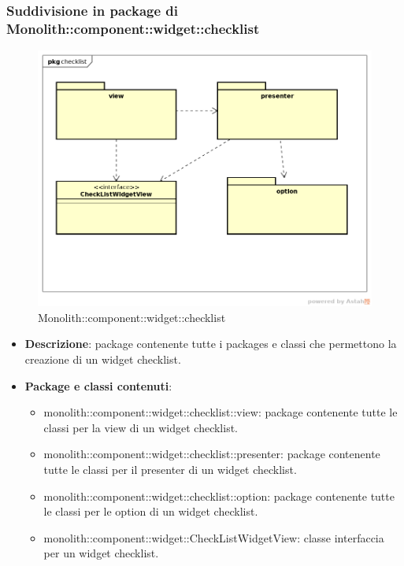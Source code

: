 \subsubsection{Suddivisione in package  di Monolith::component::widget::checklist}
\label{Monolith::component::widget::checklist}
\begin{figure}[H]
	\centering
	\includegraphics[scale=0.5]{Sezioni/imgPackage/component_widget_checklist.png}
	\caption{Monolith::component::widget::checklist}
\end{figure}
\begin{itemize}
	\item{\textbf{Descrizione}}: package contenente tutte i packages e classi che permettono la creazione di un widget checklist.
	\item{\textbf{Package e classi contenuti}}:
	\begin{itemize}
	\item{monolith::component::widget::checklist::view}: package contenente tutte le classi per la view di un widget checklist.
	\item{monolith::component::widget::checklist::presenter}: package contenente tutte le classi per il presenter di un widget checklist.
	\item{monolith::component::widget::checklist::option}: package contenente tutte le classi per le option di un widget checklist.
	\item{monolith::component::widget::CheckListWidgetView}: classe interfaccia per un widget checklist.
	\end{itemize}
	
\end{itemize}


